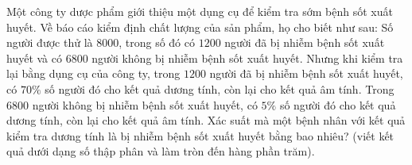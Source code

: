 \begin{ex}
Một công ty dược phẩm giới thiệu một dụng cụ để kiểm tra sớm bệnh sốt xuất huyết. Về báo cáo kiểm định chất lượng của sản phẩm, họ cho biết như sau: Số người được thử là $8000$, trong số đó có $1200$ người đã bị nhiễm bệnh sốt xuất huyết và có $6800$ người không bị nhiễm bệnh sốt xuất huyết. Nhưng khi kiểm tra lại bằng dụng cụ của công ty, trong $1200$ người đã bị nhiễm bệnh sốt xuất huyết, có $70\%$ số người đó cho kết quả dương tính, còn lại cho kết quả âm tính. Trong $6800$ người không bị nhiễm bệnh sốt xuất huyết, có $5\%$ số người đó cho kết quả dương tính, còn lại cho kết quả âm tính. Xác suất mà một bệnh nhân với kết quả kiểm tra dương tính là bị nhiễm bệnh sốt xuất huyết bằng bao nhiêu? (viết kết quả dưới dạng số thập phân và làm tròn đến hàng phần trăm).
\end{ex}

